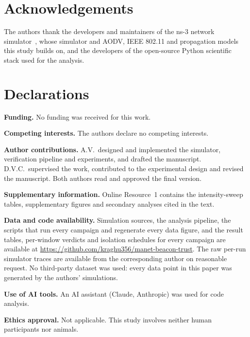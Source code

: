 \documentclass[pdflatex,sn-mathphys-num]{sn-jnl}%
\theoremstyle{thmstyleone}%
\theoremstyle{thmstyletwo}%
\theoremstyle{thmstylethree}%
\begin{document}
\section*{Acknowledgements}

The authors thank the developers and maintainers of the ns-3 network
simulator~\cite{ns3}, whose simulator and AODV, IEEE 802.11 and propagation
models this study builds on, and the developers of the open-source Python
scientific stack used for the analysis.

\section*{Declarations}

\textbf{Funding.} No funding was received for this work.

\textbf{Competing interests.} The authors declare no competing interests.

\textbf{Author contributions.} A.V.\ designed and implemented the simulator,
verification pipeline and experiments, and drafted the manuscript. D.V.C.\
supervised the work, contributed to the experimental design and revised the
manuscript. Both authors read and approved the final version.

\textbf{Supplementary information.} Online Resource~1 contains the
intensity-sweep tables, supplementary figures and secondary analyses cited in
the text.

\textbf{Data and code availability.} Simulation sources, the analysis
pipeline, the scripts that run every campaign and regenerate every data
figure, and the result tables, per-window verdicts and isolation schedules
for every campaign are available at
\url{https://github.com/kraghu356/manet-beacon-trust}. The raw per-run
simulator traces are available from the corresponding author
on reasonable request. No third-party dataset was used: every data point in
this paper was generated by the authors' simulations.

\textbf{Use of AI tools.} An AI assistant (Claude, Anthropic) was used for
code analysis.

\textbf{Ethics approval.} Not applicable. This study involves neither human
participants nor animals.


\end{document}
